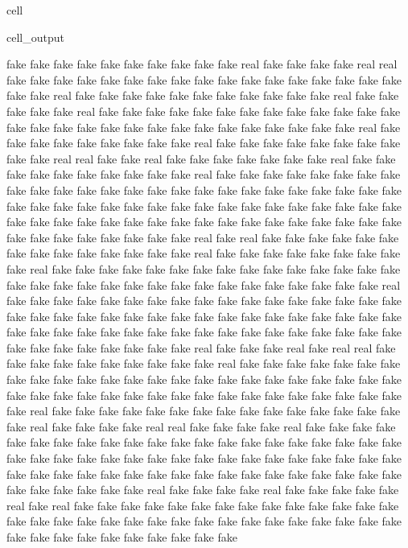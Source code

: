 \documentclass[letterpaper,10pt,brazil]{sphinxmanual}
\begin{document}
\begin{sphinxuseclass}{cell}
\begin{sphinxuseclass}{cell_output}
\begin{sphinxVerbatim}[commandchars=\\\{\}]
fake
fake
fake
fake
fake
fake
fake
fake
fake
fake
real
fake
fake
fake
fake
real
real
fake
fake
fake
fake
fake
fake
fake
fake
fake
fake
fake
fake
fake
fake
fake
fake
fake
fake
fake
real
fake
fake
fake
fake
fake
fake
fake
fake
fake
fake
fake
real
fake
fake
fake
fake
fake
real
fake
fake
fake
fake
fake
fake
fake
fake
fake
fake
fake
fake
fake
fake
fake
fake
fake
fake
fake
fake
fake
fake
fake
fake
fake
fake
fake
fake
real
fake
fake
fake
fake
fake
fake
fake
fake
fake
real
fake
fake
fake
fake
fake
fake
fake
fake
fake
fake
real
real
fake
fake
real
fake
fake
fake
fake
fake
fake
fake
real
fake
fake
fake
fake
fake
fake
fake
fake
fake
fake
real
fake
fake
fake
fake
fake
fake
fake
fake
fake
fake
fake
fake
fake
fake
fake
fake
fake
fake
fake
fake
fake
fake
fake
fake
fake
fake
fake
fake
fake
fake
fake
fake
fake
fake
fake
fake
fake
fake
fake
fake
fake
fake
fake
fake
fake
fake
fake
fake
fake
fake
fake
fake
fake
fake
fake
fake
fake
fake
fake
fake
fake
fake
fake
fake
fake
fake
fake
real
fake
real
fake
fake
fake
fake
fake
fake
fake
fake
fake
fake
fake
fake
fake
fake
real
fake
fake
fake
fake
fake
fake
fake
fake
fake
real
fake
fake
fake
fake
fake
fake
fake
fake
fake
fake
fake
fake
fake
fake
fake
fake
fake
fake
fake
fake
fake
fake
fake
fake
fake
fake
fake
fake
fake
fake
fake
real
fake
fake
fake
fake
fake
fake
fake
fake
fake
fake
fake
fake
fake
fake
fake
fake
fake
fake
fake
fake
fake
fake
fake
fake
fake
fake
fake
fake
fake
fake
fake
fake
fake
fake
fake
fake
fake
fake
fake
fake
fake
fake
fake
fake
fake
fake
fake
fake
fake
fake
fake
fake
fake
fake
fake
fake
fake
fake
fake
real
fake
fake
fake
real
fake
real
real
fake
fake
fake
fake
fake
fake
fake
fake
fake
fake
real
fake
fake
fake
fake
fake
fake
fake
fake
fake
fake
fake
fake
fake
fake
fake
fake
fake
fake
fake
fake
fake
fake
fake
fake
fake
fake
fake
fake
fake
fake
fake
fake
fake
fake
fake
fake
fake
fake
fake
fake
fake
fake
real
fake
fake
fake
fake
fake
fake
fake
fake
fake
fake
fake
fake
fake
fake
fake
fake
real
fake
fake
fake
fake
real
real
fake
fake
fake
fake
real
fake
fake
fake
fake
fake
fake
fake
fake
fake
fake
fake
fake
fake
fake
fake
fake
fake
fake
fake
fake
fake
fake
fake
fake
fake
fake
fake
fake
fake
fake
fake
fake
fake
fake
fake
fake
fake
fake
fake
fake
fake
fake
fake
fake
fake
fake
fake
fake
fake
fake
fake
fake
fake
fake
fake
fake
fake
fake
fake
fake
fake
real
fake
fake
fake
fake
real
fake
fake
fake
fake
fake
real
fake
real
fake
fake
fake
fake
fake
fake
fake
fake
fake
fake
fake
fake
fake
fake
fake
fake
fake
fake
fake
fake
fake
fake
fake
fake
fake
fake
fake
fake
fake
fake
fake
fake
fake
fake
fake
fake
fake
fake
fake
fake
fake

\end{sphinxVerbatim}
\end{sphinxuseclass}
\end{sphinxuseclass}
\end{document}
